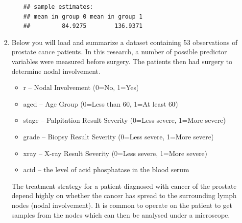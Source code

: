 \documentclass{article}\usepackage[]{graphicx}\usepackage[]{color}
\makeatletter
\newenvironment{kframe}{%
 \def\at@end@of@kframe{}%
 \ifinner\ifhmode%
  \def\at@end@of@kframe{\end{minipage}}%
  \begin{minipage}{\columnwidth}%
 \fi\fi%
 \def\FrameCommand##1{\hskip\@totalleftmargin \hskip-\fboxsep
 \colorbox{shadecolor}{##1}\hskip-\fboxsep
     \hskip-\linewidth \hskip-\@totalleftmargin \hskip\columnwidth}%
 \MakeFramed {\advance\hsize-\width
   \@totalleftmargin\z@ \linewidth\hsize
   \@setminipage}}%
 {\par\unskip\endMakeFramed%
 \at@end@of@kframe}
\newenvironment{knitrout}{}{} %
\makeatother
\begin{document}
\begin{enumerate}
\begin{enumerate}
\begin{knitrout}
\begin{kframe}
\begin{verbatim}
## sample estimates:
## mean in group 0 mean in group 1 
##         84.9275        136.9371
\end{verbatim}
\end{kframe}
\end{knitrout}
  \end{enumerate}
  \newpage
\item Below you will load and summarize a dataset containing 53 observations of prostate cance patients.
In this research, a number of possible predictor variables were measured before surgery. The patients then 
had surgery to determine nodal involvement. 
  \begin{itemize}
    \item r -- Nodal Involvement (0=No, 1=Yes)
    \item aged	-- Age Group (0=Less than 60, 1=At least 60)
    \item stage -- Palpitation Result Severity (0=Less severe, 1=More severe)
    \item grade -- Biopsy Result Severity (0=Less severe, 1=More severe)
    \item xray -- X-ray Result Severity (0=Less severe, 1=More severe)
    \item acid -- the level of acid phosphatase in the blood serum
\end{itemize}
The treatment strategy for a patient diagnosed with cancer of the prostate depend highly on whether the cancer has spread to the surrounding lymph nodes (nodal involvement). It is common to operate on the patient to get samples from the nodes which can then be analysed under a microscope.


\end{enumerate}
\end{document}
